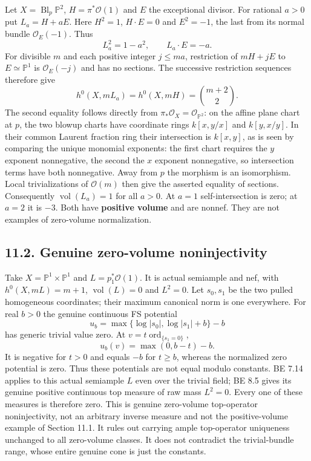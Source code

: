 \documentclass[
  10pt,
]{article}
\begin{document}
Let \(X=\operatorname{Bl}_p\mathbb P^2\), \(H=\pi^*\mathcal O(1)\) and
\(E\) the exceptional divisor. For rational \(a>0\) put \(L_a=H+aE\).
Here \(H^2=1\), \(H\cdot E=0\) and \(E^2=-1\), the last from its normal
bundle \(\mathcal O_E(-1)\). Thus \[
                     L_a^2=1-a^2,\qquad L_a\cdot E=-a.       \tag{11.1}
\] For divisible \(m\) and each positive integer \(j\leq ma\),
restriction of \(mH+jE\) to \(E\simeq\mathbb P^1\) is
\(\mathcal O_E(-j)\) and has no sections. The successive restriction
sequences therefore give \[
 h^0(X,mL_a)=h^0(X,mH)=\binom{m+2}{2}.                        \tag{11.2}
\] The second equality follows directly from
\(\pi_*\mathcal O_X=\mathcal O_{\mathbb P^2}\): on the affine plane
chart at \(p\), the two blowup charts have coordinate rings \(k[x,y/x]\)
and \(k[y,x/y]\). In their common Laurent fraction ring their
intersection is \(k[x,y]\), as is seen by comparing the unique monomial
exponents: the first chart requires the \(y\) exponent nonnegative, the
second the \(x\) exponent nonnegative, so intersection terms have both
nonnegative. Away from \(p\) the morphism is an isomorphism. Local
trivializations of \(\mathcal O(m)\) then give the asserted equality of
sections. Consequently \(\operatorname{vol}(L_a)=1\) for all \(a>0\). At
\(a=1\) self-intersection is zero; at \(a=2\) it is \(-3\). Both have
\textbf{positive volume} and are nonnef. They are not examples of
zero-volume normalization.

\subsection{11.2. Genuine zero-volume
noninjectivity}\label{genuine-zero-volume-noninjectivity}

Take \(X=\mathbb P^1\times\mathbb P^1\) and \(L=p_1^*\mathcal O(1)\). It
is actual semiample and nef, with \(h^0(X,mL)=m+1\),
\(\operatorname{vol}(L)=0\) and \(L^2=0\). Let \(s_0,s_1\) be the two
pulled homogeneous coordinates; their maximum canonical norm is one
everywhere. For real \(b>0\) the genuine continuous FS potential \[
                  u_b=\max\{\log|s_0|,\log|s_1|+b\}-b       \tag{11.3}
\] has generic trivial value zero. At
\(v=t\operatorname{ord}_{\{s_1=0\}}\), \[
                         u_b(v)=\max(0,b-t)-b.                \tag{11.4}
\] It is negative for \(t>0\) and equals \(-b\) for \(t\geq b\), whereas
the normalized zero potential is zero. Thus these potentials are not
equal modulo constants. BE 7.14 applies to this actual semiample \(L\)
even over the trivial field; BE 8.5 gives its genuine positive
continuous top measure of raw mass \(L^2=0\). Every one of these
measures is therefore zero. This is genuine zero-volume top-operator
noninjectivity, not an arbitrary inverse measure and not the
positive-volume example of Section 11.1. It rules out carrying ample
top-operator uniqueness unchanged to all zero-volume classes. It does
not contradict the trivial-bundle range, whose entire genuine cone is
just the constants.
\end{document}
